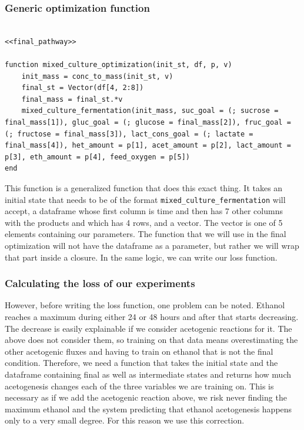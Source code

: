 \documentclass[11pt]{article}
\begin{document}
\subsubsection{Generic optimization function}
\label{sec:orgf0b8314}
\begin{verbatim}

<<final_pathway>>

function mixed_culture_optimization(init_st, df, p, v)
    init_mass = conc_to_mass(init_st, v)
    final_st = Vector(df[4, 2:8])
    final_mass = final_st.*v
    mixed_culture_fermentation(init_mass, suc_goal = (; sucrose = final_mass[1]), gluc_goal = (; glucose = final_mass[2]), fruc_goal = (; fructose = final_mass[3]), lact_cons_goal = (; lactate = final_mass[4]), het_amount = p[1], acet_amount = p[2], lact_amount = p[3], eth_amount = p[4], feed_oxygen = p[5])
end

\end{verbatim}

This function is a generalized function that does this exact thing. It takes an initial state that needs to be of the format \texttt{mixed\_culture\_fermentation} will accept, a dataframe whose first column is time and then has 7 other columns with the products and which has 4 rows, and a vector. The vector is one of 5 elements containing our parameters. The function that we will use in the final optimization will not have the dataframe as a parameter, but rather we will wrap that part inside a closure. In the same logic, we can write our loss function.

\subsubsection{Calculating the loss of our experiments}
\label{sec:org45ffdeb}
However, before writing the loss function, one problem can be noted. Ethanol reaches a maximum during either 24 or 48 hours and after that starts decreasing. The decrease is easily explainable if we consider acetogenic reactions for it. The above does not consider them, so training on that data means overestimating the other acetogenic fluxes and having to train on ethanol that is not the final condition. Therefore, we need a function that takes the initial state and the dataframe containing final as well as intermediate states and returns how much acetogenesis changes each of the three variables we are training on. This is necessary as if we add the acetogenic reaction above, we risk never finding the maximum ethanol and the system predicting that ethanol acetogenesis happens only to a very small degree. For this reason we use this correction.
\end{document}
